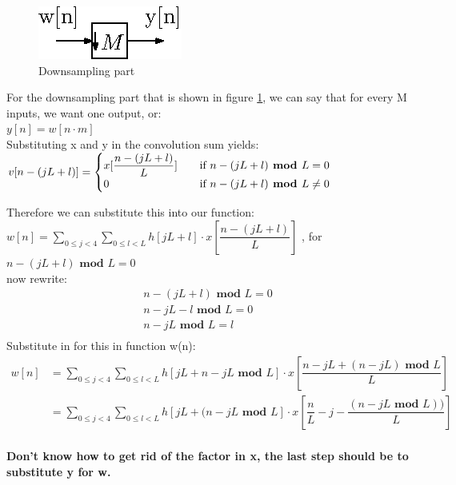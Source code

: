 \documentclass[a4paper,twoside,11pt, fleqn]{article}
\begin{document}
\begin{figure}[h]
	\centering
	\includegraphics[scale = 1.3]{Images/3_03}
    \caption{Downsampling part}
    \label{fig:down}
\end{figure}

For the downsampling part that is shown in figure \ref{fig:down}, we can say that for every M inputs, we want one output, or:\\

$y[n] = w[n\cdot m]$\\

Substituting x and y in the convolution sum yields:\\

$ v[n - (jL + l)] =
  \begin{cases}
    x[\dfrac{n - (jL + l)}{L}]      & \quad \text{if } n - (jL + l) \text{\textbf{ mod }} L = 0\\
    0  					& \quad \text{if } n - (jL + l) \text{\textbf{ mod }} L \neq 0\\
  \end{cases}$
  
Therefore we can substitute this into our function:\\

$w[n] = \sum_{0\leq j<4}  \sum_{0\leq l<L} h[jL + l]\cdot x[\dfrac{n - (jL + l)}{L}]$ , for $n - (jL + l) \textbf{ mod } L = 0$\\

now rewrite:
\begin{align*}
n - (jL + l) \textbf{ mod } L = 0\\
n - jL - l \textbf{ mod } L = 0\\
n - jL \textbf{ mod } L = l\\
\end{align*}
Substitute in for this in function w(n):
\begin{align*}
w[n] &= \sum_{0\leq j<4}  \sum_{0\leq l<L} h[jL + n - jL \textbf{ mod } L]\cdot x[\dfrac{n - jL + (n - jL) \textbf{ mod } L}{L}]\\
	 &= \sum_{0\leq j<4}  \sum_{0\leq l<L} h[jL + (n - jL \textbf{ mod } L]\cdot x[\dfrac{n}{L} - {j}  - \dfrac{(n - jL \textbf{ mod } L))}{L}]\\
\end{align*}

\textbf{Don't know how to get rid of the factor in x, the last step should be to substitute y for w.}
\end{document}
